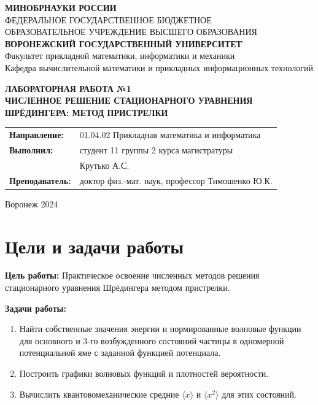 \documentclass[a4paper, 12pt]{article}
\begin{document}
\begin{center}
\textbf{МИНОБРНАУКИ РОССИИ}\\
ФЕДЕРАЛЬНОЕ ГОСУДАРСТВЕННОЕ БЮДЖЕТНОЕ \\
ОБРАЗОВАТЕЛЬНОЕ УЧРЕЖДЕНИЕ ВЫСШЕГО ОБРАЗОВАНИЯ \\
\textbf{\"ВОРОНЕЖСКИЙ ГОСУДАРСТВЕННЫЙ УНИВЕРСИТЕТ\"} \\
Факультет прикладной математики, информатики и механики\\
Кафедра вычислительной математики и прикладных информационных технологий
\end{center}

\vspace{2cm}
\begin{center}
\textbf{ЛАБОРАТОРНАЯ РАБОТА №1}\\
\textbf{ЧИСЛЕННОЕ РЕШЕНИЕ СТАЦИОНАРНОГО УРАВНЕНИЯ ШРЁДИНГЕРА: МЕТОД ПРИСТРЕЛКИ}
\end{center}

\vspace{3cm}
\begin{flushright}
\begin{tabular}{l l}
\textbf{Направление:} & 01.04.02 \textendash{} Прикладная математика и информатика \\
\textbf{Выполнил:} & студент 11 группы 2 курса магистратуры \\
& Крутько А.С. \\
\textbf{Преподаватель:} & доктор физ.-мат. наук, профессор Тимошенко Ю.К.
\end{tabular}
\end{flushright}

\vspace{3cm}
\begin{center}
Воронеж 2024
\end{center}

\newpage
\tableofcontents

\newpage
\section{Цели и задачи работы}
\textbf{Цель работы:} Практическое освоение численных методов решения стационарного уравнения Шрёдингера методом пристрелки.

\textbf{Задачи работы:}
\begin{enumerate}
    \item Найти собственные значения энергии и нормированные волновые функции для основного и 3-го возбужденного состояний частицы в одномерной потенциальной яме с заданной функцией потенциала.
    \item Построить графики волновых функций и плотностей вероятности.
    \item Вычислить квантовомеханические средние $\langle x \rangle$ и $\langle x^2 \rangle$ для этих состояний.
\end{enumerate}
\end{document}
